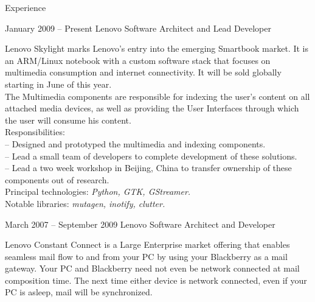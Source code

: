 \documentclass[letterpaper, 11pt]{article}
\begin{document}
    \begin{resume}
        \begin{category}{Experience}
            \begin{block}
                 {January 2009 -- Present}
                         {Lenovo}          {Software Architect and Lead Developer}
                \par
                Lenovo Skylight marks Lenovo's entry into the emerging Smartbook market.
                It is an ARM/Linux notebook with a custom software stack that focuses
                on multimedia consumption and internet connectivity.  It will be sold
                globally starting in June of this year.
                \\[1ex]
                The Multimedia components are responsible for indexing the user's content on all
                attached media devices, as well as providing the User Interfaces through which the user will
                consume his content.
                \\[1ex]
                Responsibilities: \\
                -- Designed and prototyped the multimedia and indexing components. \\
                -- Lead a small team of developers to complete development of these solutions. \\
                -- Lead a two week workshop in Beijing, China to transfer ownership of these components out of research.
                \\[1ex]
                Principal technologies: \emph{Python, GTK, GStreamer.} \\
                Notable libraries: \emph{mutagen, inotify, clutter.}
            \end{block}
            \begin{block}
                 {March 2007 -- September 2009}
                         {Lenovo}                  {Software Architect and Developer}
                \par
                Lenovo Constant Connect is a Large Enterprise market offering that enables
                seamless mail flow to and from your PC by using your Blackberry as a mail
                gateway.  Your PC and Blackberry need not even be network connected at mail
                composition time.  The next time either device is network connected, even if your
                PC is asleep, mail will be synchronized.
                \\[1ex]

\end{block}
\end{category}
\end{resume}
\end{document}

